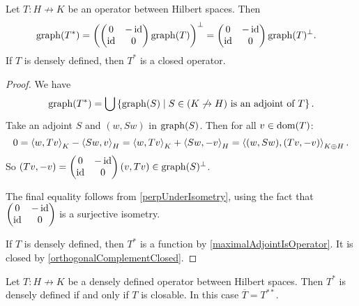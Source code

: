 \begin{proposition} \label{adjointGraph}
Let $T: H\not\to K$ be an operator between Hilbert spaces. Then
\begin{align*}
\operatorname{graph}(T^*) &= \left( \begin{pmatrix}
0 & -\operatorname{id} \\ \operatorname{id} & 0
\end{pmatrix}\operatorname{graph}(T) \right)^\perp 
=  \begin{pmatrix}
0 & -\operatorname{id} \\ \operatorname{id} & 0
\end{pmatrix}\operatorname{graph}(T)^\perp.
\end{align*}
If $T$ is densely defined, then $T^*$ is a closed operator.
\end{proposition}
\begin{proof}
We have
\[ \operatorname{graph}(T^*) = \bigcup\left\{ \operatorname{graph}(S) \;\middle|\; \text{$S\in (K\not\to H)$ is an adjoint of $T$} \right\}. \]
Take an adjoint $S$ and $(w, Sw)$ in $\operatorname{graph}(S)$. Then for all $v\in\operatorname{dom}(T)$:
\[ 0 = \left\langle w, Tv \right\rangle_K - \left\langle Sw, v \right\rangle_H = \left\langle w, Tv \right\rangle_K + \left\langle Sw, -v \right\rangle_H = \left\langle (w, Sw), (Tv,-v) \right\rangle_{K\oplus H}. \]
So $(Tv,-v) = \begin{pmatrix}
0 & -\operatorname{id} \\ \operatorname{id} & 0
\end{pmatrix} (v,Tv) \in \operatorname{graph}(S)^\perp $.

The final equality follows from \ref{perpUnderIsometry}, using the fact that $\begin{pmatrix}
0 & -\operatorname{id} \\ \operatorname{id} & 0
\end{pmatrix}$ is a surjective isometry.

If $T$ is densely defined, then $T^*$ is a function by \ref{maximalAdjointIsOperator}. It is closed by \ref{orthogonalComplementClosed}.
\end{proof}
\begin{corollary} \label{adjointDenselyDefinedClosable}
Let $T: H\not\to K$ be a densely defined operator between Hilbert spaces. Then $T^*$ is densely defined \textup{if and only if} $T$ is closable. In this case $\overline{T} = T^{**}$.
\end{corollary}

